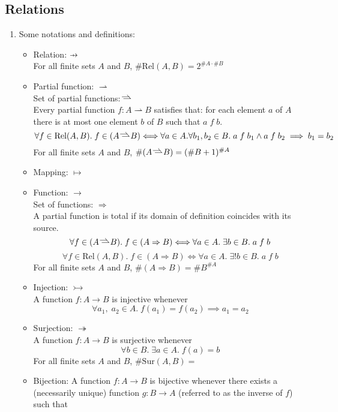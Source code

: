 \documentclass{article}
\newcommand\pfun{\mathrel{\ooalign{\hfil$\mapstochar\mkern5mu$\hfil\cr$\to$\cr}}}
\newcommand{\partf}{\rightharpoonup\!\!\!\!\!\!\!\!\!\raisebox{2.5pt}{$\rightharpoonup$}}
\begin{document}
\subsection{Relations}
\begin{enumerate}
    \item Some notations and definitions:
        \begin{itemize}[topsep=0pt]
            \item Relation: $\pfun$\\
                For all finite sets $A$ and $B$, $\#\text{Rel}(A, B)=2^{\#A\cdot\#B}$
            \item Partial function: $\rightharpoonup$\\
                Set of partial functions: $\partf$\\
                Every partial function $f:A\rightharpoonup B$ satisfies that: for each element $a$ of $A$ there is at most one element $b$ of $B$ such that $a\;f\;b$.
                $$\forall f\in\text{Rel}(A, B).\;f\in(A\partf\;B)\Longleftrightarrow\forall a\in A.\forall b_1,b_2\in B.\;a\;f\;b_1\wedge a\;f\;b_2\implies b_1=b_2$$
                For all finite sets $A$ and $B$, $\#(A\partf\;B) = (\#B+1)^{\#A}$
            \item Mapping: $\mapsto$
            \item Function: $\rightarrow$\\
                Set of functions: $\Rightarrow$\\
                A partial function is total if its domain of definition coincides with its source.
                $$\forall f\in(A\partf\;B).\;f\in(A\Rightarrow B)\Longleftrightarrow\forall a\in A.\;\exists b\in B.\;a\;f\;b$$
                $$\forall f\in\text{Rel}(A, B).\;f\in(A\Rightarrow B)\Longleftrightarrow\forall a\in A.\;\exists!b\in B.\;a\;f\;b$$
                For all finite sets $A$ and $B$, $\#(A\Rightarrow B) = \#B^{\#A}$
            \item Injection: $\rightarrowtail$\\
                A function $f:A\rightarrow B$ is injective whenever 
                $$\forall a_1,\;a_2\in A.\;f(a_1)=f(a_2)\implies a_1=a_2$$
            \item Surjection: $\twoheadrightarrow$\\
                A function $f:A\rightarrow B$ is surjective whenever 
                $$\forall b\in B.\;\exists a\in A.\;f(a)=b$$
                For all finite sets $A$ and $B$, $\#\text{Sur}(A,B)=$
            \item Bijection: A function $f:A\rightarrow B$ is bijective whenever there exists a (necessarily unique) function $g:B\rightarrow A$ (referred to as the inverse of $f$) such that

\end{itemize}
\end{enumerate}
\end{document}
